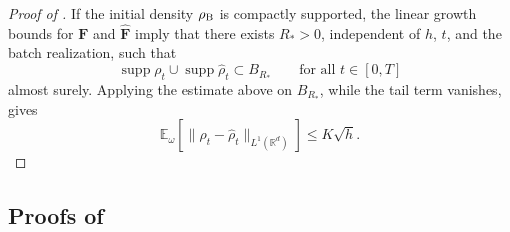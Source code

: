\documentclass[twoside,11pt]{article}
\theoremstyle{plain}
\def\R{\mathbb R}
\def\E{\mathbb E}
\newcommand{\bfF}{\mathbf{F}}
\begin{document}
\begin{proof}[Proof of ]
If the initial density $\rho_{\rm B}$ is compactly supported, the linear growth
bounds for $\bfF$ and $\hat{\bfF}$ imply that there exists $R_\ast>0$,
independent of $h$, $t$, and the batch realization, such that
\[
\operatorname{supp}\rho_t\cup\operatorname{supp}\hat\rho_t
\subset B_{R_\ast}
\qquad\text{for all }t\in[0,T]
\]
almost surely. Applying the estimate above on $B_{R_\ast}$, while
the tail term vanishes, gives
\[
\E_\omega\left[\|\rho_t-\hat\rho_t\|_{L^1(\R^d)}\right]
\le K\sqrt h.
\]
\end{proof}



\subsection*{Proofs of }
\end{document}
